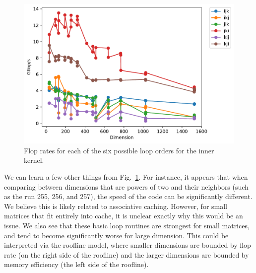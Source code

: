 \documentclass{article}
\begin{document}
\begin{figure}
    \centering
    \includegraphics[width=0.6\columnwidth]{timing_loop_order.pdf}
    \caption{Flop rates for each of the six possible loop orders for the inner kernel.}
    \label{fig:timing-loop-order}
\end{figure}

We can learn a few other things from Fig.~\ref{fig:timing-loop-order}. For instance, it appears that when comparing between dimensions that are powers of two and their neighbors (such as the run 255, 256, and 257), the speed of the code can be significantly different. We believe this is likely related to associative caching. However, for small matrices that fit entirely into cache, it is unclear exactly why this would be an issue. We also see that these basic loop routines are strongest for small matrices, and tend to become significantly worse for large dimension. This could be interpreted via the roofline model, where smaller dimensions are bounded by flop rate (on the right side of the roofline) and the larger dimensions are bounded by memory efficiency (the left side of the roofline).
\end{document}
